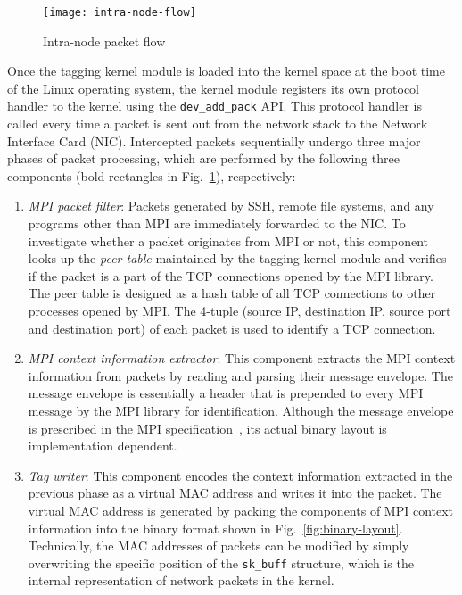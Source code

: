 \begin{figure}
    \centering
    \texttt{[image: intra-node-flow]}
    \caption{Intra-node packet flow}%
    \label{fig:intra-node-flow}
\end{figure}

Once the tagging kernel module is loaded into the kernel space at the
boot time of the Linux operating system, the kernel module registers its
own protocol handler to the kernel using the
\lstinline!dev_add_pack! API\@. This protocol handler is
called every time a packet is sent out from the network stack to the
Network Interface Card (NIC). Intercepted packets sequentially undergo
three major phases of packet processing, which are performed by the
following three components (bold rectangles in
Fig.~\ref{fig:intra-node-flow}), respectively:

\begin{enumerate}
\def\labelenumi{\arabic{enumi}.}
\item
  \emph{MPI packet filter}: Packets generated by SSH, remote file
  systems, and any programs other than MPI are immediately forwarded to
  the NIC\@. To investigate whether a packet originates from MPI or not,
  this component looks up the \emph{peer table} maintained by the
  tagging kernel module and verifies if the packet is a part of the TCP
  connections opened by the MPI library. The peer table is designed as a
  hash table of all TCP connections to other processes opened by MPI\@.
  The 4-tuple (source IP, destination IP, source port and destination
  port) of each packet is used to identify a TCP connection.
\item
  \emph{MPI context information extractor}: This component extracts the
  MPI context information from packets by reading and parsing their
  message envelope. The message envelope is essentially a header that is
  prepended to every MPI message by the MPI library for identification.
  Although the message envelope is prescribed in the MPI
  specification~\autocite{MessagePassingInterfaceForum2015}, its actual binary
  layout is implementation dependent.
\item
  \emph{Tag writer}: This component encodes the context information
  extracted in the previous phase as a virtual MAC address and writes it
  into the packet. The virtual MAC address is generated by packing the
  components of MPI context information into the binary format shown in
  Fig.~\ref{fig:binary-layout}. Technically, the MAC addresses of
  packets can be modified by simply overwriting the specific position of
  the \lstinline!sk_buff! structure, which is the
  internal representation of network packets in the kernel.
\end{enumerate}

